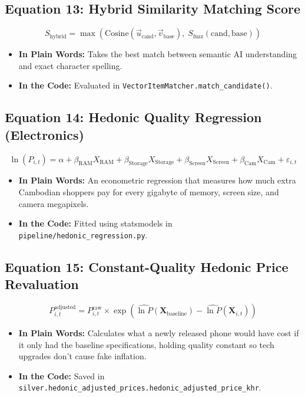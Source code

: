 \documentclass[11pt,a4paper,oneside]{article}
\begin{document}
\subsection{Equation 13: Hybrid Similarity Matching Score}
\begin{equation}
S_{\text{hybrid}} = \max\left( \text{Cosine}(\vec{u}_{\text{cand}}, \vec{v}_{\text{base}}), \; S_{\text{fuzz}}(\text{cand}, \text{base}) \right)
\end{equation}
\begin{itemize}
    \item \textbf{In Plain Words:} Takes the best match between semantic AI understanding and exact character spelling.
    \item \textbf{In the Code:} Evaluated in \texttt{VectorItemMatcher.match\_candidate()}.
\end{itemize}

\subsection{Equation 14: Hedonic Quality Regression (Electronics)}
\begin{equation}
\ln(P_{i, t}) = \alpha + \beta_{\text{RAM}} X_{\text{RAM}} + \beta_{\text{Storage}} X_{\text{Storage}} + \beta_{\text{Screen}} X_{\text{Screen}} + \beta_{\text{Cam}} X_{\text{Cam}} + \varepsilon_{i, t}
\end{equation}
\begin{itemize}
    \item \textbf{In Plain Words:} An econometric regression that measures how much extra Cambodian shoppers pay for every gigabyte of memory, screen size, and camera megapixels.
    \item \textbf{In the Code:} Fitted using statsmodels in \texttt{pipeline/hedonic\_regression.py}.
\end{itemize}

\subsection{Equation 15: Constant-Quality Hedonic Price Revaluation}
\begin{equation}
P_{i, t}^{\text{adjusted}} = P_{i, t}^{\text{raw}} \times \exp\left( \widehat{\ln P}(\mathbf{X}_{\text{baseline}}) - \widehat{\ln P}(\mathbf{X}_{i, t}) \right)
\end{equation}
\begin{itemize}
    \item \textbf{In Plain Words:} Calculates what a newly released phone would have cost if it only had the baseline specifications, holding quality constant so tech upgrades don't cause fake inflation.
    \item \textbf{In the Code:} Saved in \texttt{silver.hedonic\_adjusted\_prices.hedonic\_adjusted\_price\_khr}.
\end{itemize}
\end{document}
